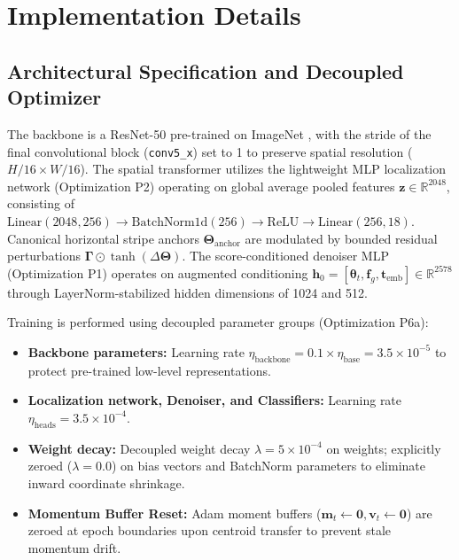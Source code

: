 \section{Implementation Details}
\label{sec:implementation_details}

\subsection{Architectural Specification and Decoupled Optimizer}

The backbone is a ResNet-50 \cite{he2016deep} pre-trained on ImageNet \cite{deng2009imagenet}, with the stride of the final convolutional block (\texttt{conv5\_x}) set to 1 to preserve spatial resolution ($H/16 \times W/16$). The spatial transformer utilizes the lightweight MLP localization network (Optimization P2) operating on global average pooled features $\mathbf{z} \in \mathbb{R}^{2048}$, consisting of $\text{Linear}(2048, 256) \to \text{BatchNorm1d}(256) \to \text{ReLU} \to \text{Linear}(256, 18)$. Canonical horizontal stripe anchors $\mathbf{\Theta}_{\text{anchor}}$ are modulated by bounded residual perturbations $\boldsymbol{\Gamma} \odot \tanh(\Delta \mathbf{\Theta})$. The score-conditioned denoiser MLP (Optimization P1) operates on augmented conditioning $\mathbf{h}_0 = [\boldsymbol{\theta}_t, \mathbf{f}_g, \mathbf{t}_{\text{emb}}] \in \mathbb{R}^{2578}$ through LayerNorm-stabilized hidden dimensions of 1024 and 512.

Training is performed using decoupled parameter groups (Optimization P6a):
\begin{itemize}
    \item \textbf{Backbone parameters:} Learning rate $\eta_{\text{backbone}} = 0.1 \times \eta_{\text{base}} = 3.5 \times 10^{-5}$ to protect pre-trained low-level representations.
    \item \textbf{Localization network, Denoiser, and Classifiers:} Learning rate $\eta_{\text{heads}} = 3.5 \times 10^{-4}$.
    \item \textbf{Weight decay:} Decoupled weight decay $\lambda = 5 \times 10^{-4}$ on weights; explicitly zeroed ($\lambda = 0.0$) on bias vectors and BatchNorm parameters to eliminate inward coordinate shrinkage.
    \item \textbf{Momentum Buffer Reset:} Adam moment buffers ($\mathbf{m}_t \leftarrow \mathbf{0}, \mathbf{v}_t \leftarrow \mathbf{0}$) are zeroed at epoch boundaries upon centroid transfer to prevent stale momentum drift.
\end{itemize}


